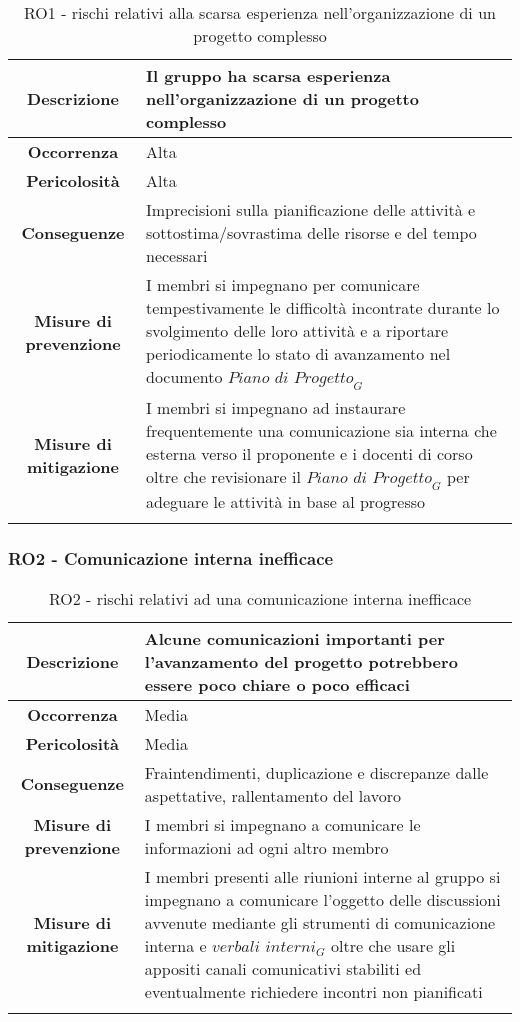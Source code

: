  
\begin{longtable}{|c|p{12cm}|}
\hline
\textbf{Descrizione} & Il gruppo ha scarsa esperienza nell'organizzazione di un progetto complesso \\
\hline
\textbf{Occorrenza} & Alta \\
\hline
\textbf{Pericolosità} & Alta \\
\hline
\textbf{Conseguenze} & Imprecisioni sulla pianificazione delle attività e sottostima/sovrastima delle risorse e del tempo necessari\\
\hline
\textbf{Misure di prevenzione} & I membri si impegnano per comunicare tempestivamente le difficoltà incontrate durante lo svolgimento delle loro attività e a riportare periodicamente lo stato di avanzamento nel documento $\textit{Piano di Progetto}_G$ \\
\hline
\textbf{Misure di mitigazione} & I membri si impegnano ad instaurare frequentemente una comunicazione sia interna che esterna verso il proponente e i docenti di corso oltre che revisionare il $\textit{Piano di Progetto}_G$ per adeguare le attività in base al progresso\\
\hline
\caption{RO1 - rischi relativi alla scarsa esperienza nell'organizzazione di un progetto complesso}
\end{longtable}

%
%
\subsubsection[RO2]{RO2 - Comunicazione interna inefficace}\label{ro:2}
\begin{longtable}{|c|p{12cm}|}
\hline
\textbf{Descrizione} & Alcune comunicazioni importanti per l'avanzamento del progetto potrebbero essere poco chiare o poco efficaci\\
\hline
\textbf{Occorrenza} & Media \\
\hline
\textbf{Pericolosità} & Media \\
\hline
\textbf{Conseguenze} & Fraintendimenti, duplicazione e discrepanze dalle aspettative, rallentamento del lavoro \\
\hline
\textbf{Misure di prevenzione} & I membri si impegnano a comunicare le informazioni ad ogni altro membro \\
\hline
\textbf{Misure di mitigazione} & I membri presenti alle riunioni interne al gruppo si impegnano a comunicare l'oggetto delle discussioni avvenute mediante gli strumenti di comunicazione interna e $\textit{verbali interni}_G$ oltre che usare gli appositi canali comunicativi stabiliti ed eventualmente richiedere incontri non pianificati\\
\hline
\caption{RO2 - rischi relativi ad una comunicazione interna inefficace}
\end{longtable}

